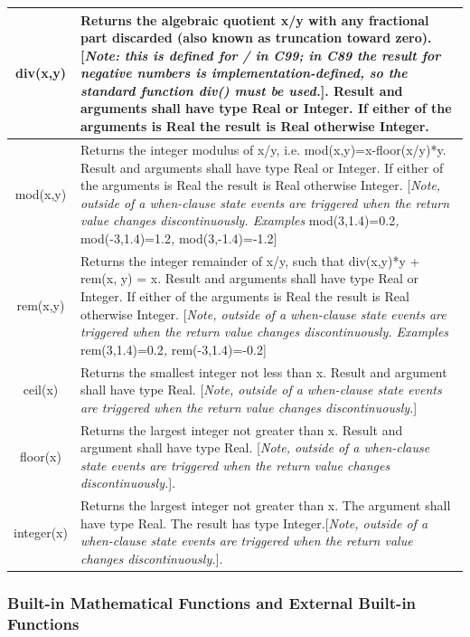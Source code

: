 \documentclass[10pt,a4paper]{report}
\def\doublelabel#1{\label{#1}\hypertarget{#1}{}}
\begin{document}
\begin{longtable}{|c|p{8cm}|} \hline
div(x,y) & Returns the algebraic quotient x/y with any fractional part
discarded (also known as truncation toward zero). {[}\emph{Note: this is
defined for / in C99; in C89 the result for negative numbers is
implementation-defined, so the standard function div() must be
used.}{]}. Result and arguments shall have type Real or Integer. If
either of the arguments is Real the result is Real otherwise
Integer.\\ \hline
mod(x,y) & Returns the integer modulus of x/y, i.e.
mod(x,y)=x-floor(x/y)*y. Result and arguments shall have type Real or
Integer. If either of the arguments is Real the result is Real otherwise
Integer. {[}\emph{Note, outside of a when-clause state events are
triggered when the return value changes discontinuously. Examples}
mod(3,1.4)=0.2\emph{,} mod(-3,1.4)=1.2\emph{,}
mod(3,-1.4)=-1.2{]}\\ \hline
rem(x,y) & Returns the integer remainder of x/y, such that div(x,y)*y +
rem(x, y) = x. Result and arguments shall have type Real or Integer. If
either of the arguments is Real the result is Real otherwise Integer.
{[}\emph{Note, outside of a when-clause state events are triggered when
the return value changes discontinuously. Examples}
rem(3,1.4)=0.2\emph{,} rem(-3,1.4)=-0.2{]}\\ \hline
ceil(x) & Returns the smallest integer not less than x. Result and
argument shall have type Real. {[}\emph{Note, outside of a when-clause
state events are triggered when the return value changes
discontinuously.}{]}\\ \hline
floor(x) & Returns the largest integer not greater than x. Result and
argument shall have type Real. {[}\emph{Note, outside of a when-clause
state events are triggered when the return value changes
discontinuously.}{]}.\\ \hline
integer(x) & Returns the largest integer not greater
than x. The argument shall have type Real. The result has type
Integer.{[}\emph{Note, outside of a when-clause state
events are triggered when the return value changes
discontinuously.}{]}.\\ \hline
\end{longtable}

\subsubsection{Built-in Mathematical Functions and External Built-in Functions}\label{built-in-mathematical-functions-and-external-built-in-functions}\doublelabel{built-in-mathematical-functions-and-external-built-in-functions}
\end{document}
